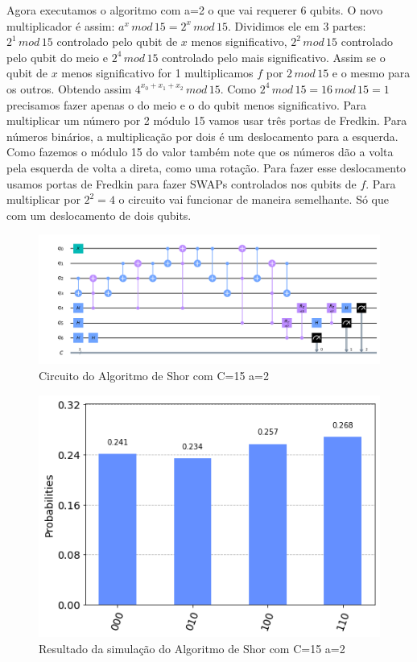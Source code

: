 \documentclass[12pt,a4paper]{article}
\begin{document}
Agora executamos o algoritmo com a=2 o que vai requerer 6 qubits.
O novo multiplicador é assim: $a^x\, mod\, 15=2^x\, mod\, 15$. Dividimos ele em 3 partes: $2^1\, mod\, 15$ controlado pelo qubit de $x$ menos significativo, $2^2\, mod\, 15$ controlado pelo qubit do meio e $2^4\, mod\, 15$ controlado pelo mais significativo. Assim se o qubit de $x$ menos significativo for 1 multiplicamos $f$ por $2\,mod\,15$ e o mesmo para os outros. Obtendo assim $4^{x_0+x_1+x_2}\, mod\, 15$. Como $2^4\,mod\,15=16\,mod\,15=1$ precisamos fazer apenas o do meio e o do qubit menos significativo. Para multiplicar um número por 2 módulo 15 vamos usar três portas de Fredkin. 
Para números binários, a multiplicação por dois é um deslocamento para a esquerda. Como fazemos o módulo 15 do valor também note que os números dão a volta pela esquerda de volta a direta, como uma rotação. Para fazer esse deslocamento usamos portas de Fredkin para fazer SWAPs controlados nos qubits de $f$. Para multiplicar por $2^2=4$ o circuito vai funcionar de maneira semelhante. Só que com um deslocamento de dois qubits.


\begin{figure}[h!]
    \centering
    \includegraphics[width=1\textwidth]{shora2draw.png}
        \caption{Circuito do Algoritmo de Shor com C=15 a=2}
    \label{fig:groovercq}
\end{figure}

\begin{figure}[h!]
    \centering
    \includegraphics[width=1\textwidth]{shora2simu.png}
        \caption{Resultado da simulação do Algoritmo de Shor com C=15 a=2}
    \label{fig:shora4simu}
\end{figure}
\end{document}
